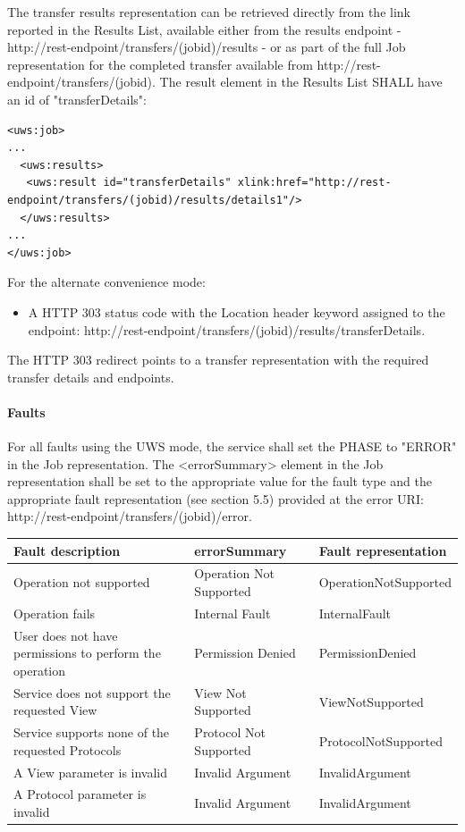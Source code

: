 \documentclass[11pt,a4paper]{ivoa}
\begin{document}
The transfer results representation can be retrieved directly from the link reported in the Results List, available either from the results endpoint - http://rest-endpoint/transfers/(jobid)/results - or as part of the full Job representation for the completed transfer available from http://rest-endpoint/transfers/(jobid). The result element in the Results List SHALL have an id of "transferDetails":
\begin{lstlisting}
<uws:job>
...
  <uws:results>
   <uws:result id="transferDetails" xlink:href="http://rest-endpoint/transfers/(jobid)/results/details1"/>
  </uws:results>
...
</uws:job>
\end{lstlisting}
For the alternate convenience mode:
\begin{itemize}
    \item A HTTP 303 status code with the Location header keyword assigned to the endpoint: http://rest-endpoint/transfers/(jobid)/results/transferDetails.
\end{itemize}
The HTTP 303 redirect points to a transfer representation with the required transfer details and endpoints.

\paragraph{Faults}
For all faults using the UWS mode, the service shall set the PHASE to "ERROR" in the Job representation. The <errorSummary> element in the Job representation shall be set to the appropriate value for the fault type and the appropriate fault representation (see section 5.5) provided at the error URI: http://rest-endpoint/transfers/(jobid)/error.

\vspace{3mm}
\begin{tabular}{ p{5cm} l p{4cm} }
\textbf{Fault description} & \textbf{errorSummary} & \textbf{Fault representation} \\
\hline
Operation not supported & Operation Not Supported & OperationNotSupported \\
\hline
Operation fails & Internal Fault & InternalFault \\
\hline
User does not have permissions to perform the operation	 & Permission Denied & PermissionDenied \\
\hline
Service does not support the requested View & View Not Supported & ViewNotSupported \\
\hline
Service supports none of the requested Protocols & Protocol Not Supported &ProtocolNotSupported \\
\hline
A View parameter is invalid & Invalid Argument & InvalidArgument \\
\hline
A Protocol parameter is invalid & Invalid Argument & InvalidArgument \\
\hline
\end{tabular}
\vspace{3mm}
\end{document}
